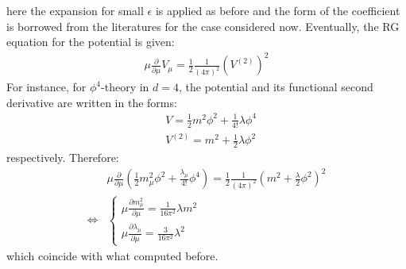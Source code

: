 \documentclass[fleqn]{article}
\begin{document}
here the expansion for small $\epsilon$ is applied as before and the form of the coefficient is borrowed from the literatures for the case considered now. Eventually, the RG equation for the potential is given:
\begin{align}
\mu \frac{\partial}{\partial \mu} V_{\mu} = \frac{1}{2} \frac{1}{(4\pi)^{2}}(V^{(2)})^2 
\end{align}
For instance, for $\phi ^{4} $-theory in $d=4$, the potential and its functional second derivative are written in the forms:
\begin{align}
&V = \frac{1}{2}m^{2}\phi ^{2} + \frac{1}{4!} \lambda \phi ^{4} \\
&V^{(2)} = m^{2} + \frac{1}{2} \lambda \phi^{2}
\end{align}
respectively. Therefore:
\begin{align}
&\mu \frac{\partial}{\partial \mu} (\frac{1}{2} m_{\mu}^{2} \phi ^{2} + \frac{\lambda _{\mu}}{4!} \phi ^{4}) = \frac{1}{2}\frac{1}{(4\pi)^{2}}(m^{2} + \frac{\lambda}{2}\phi ^{2})^{2} \nonumber \\
\Leftrightarrow &\begin{cases}
\mu \frac{\partial m_{\mu}^{2}}{\partial \mu} = \frac{1}{16\pi ^{2}}\lambda m^{2} \\
\mu \frac{\partial \lambda_{\mu}}{\partial \mu} = \frac{3}{16\pi^{2}}\lambda ^{2}
\end{cases}
\end{align}
which coincide with what computed before. 
\end{document}
